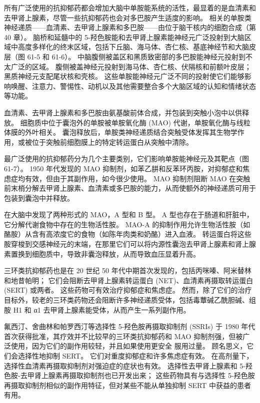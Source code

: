 所有广泛使用的抗抑郁药都会增加大脑中单胺能系统的活性，最显着的是血清素和去甲肾上腺素，尽管一些抗抑郁药也会对多巴胺产生适度的影响。 相关的单胺类神经递质——血清素、去甲肾上腺素和多巴胺——由位于脑干核内的细胞合成（第 40 章）。 脑桥和延髓中的 5-羟色胺能和去甲肾上腺素能神经元广泛投射到大脑区域中高度多样化的终末区域，包括下丘脑、海马体、杏仁核、基底神经节和大脑皮层（图 61-5 和 61-6）。 中脑腹侧被盖区和黑质致密部的多巴胺能神经元投射到不太广泛的区域。 腹侧被盖神经元投射到海马体、杏仁核、伏隔核和前额叶皮层； 黑质神经元支配尾状核和壳核。 这些单胺能神经元广泛不同的投射使它们能够影响唤醒、注意力、警惕性、动机以及其他需要整合多个大脑区域的认知和情绪状态等功能。

血清素、去甲肾上腺素和多巴胺由氨基酸前体合成，并包装到突触小泡中以供释放。 细胞质中位于囊泡外的单胺被单胺氧化酶 (MAO) 代谢，单胺氧化酶与线粒体膜的外叶相关。 囊泡释放后，单胺类神经递质结合突触受体发挥其生物学作用，或被位于突触前细胞膜上的特定转运蛋白从突触中清除。

最广泛使用的抗抑郁药分为几个主要类别，它们影响单胺能神经元及其靶点（图 61-7）。 1950 年代发现的 MAO 抑制剂，如苯乙肼和反苯环丙胺，对抑郁症和焦虑症均有效，但由于其副作用，如今很少使用。 MAO 抑制剂阻断 MAO 在突触前末梢分解去甲肾上腺素、血清素或多巴胺的能力，从而使额外的神经递质可用于包装到囊泡中并释放。

在大脑中发现了两种形式的 MAO，A 型和 B 型。 A 型也存在于肠道和肝脏中，它分解代谢食物中存在的生物活性胺。 MAO-A 的抑制作用允许生物活性胺（如酪胺）从含有高浓度它的食物（如陈年肉类和奶酪）进入血液。 转运蛋白将这些胺穿梭到交感神经元的末端，在那里它们可以将内源性囊泡去甲肾上腺素和肾上腺素置换到细胞质中，导致非囊泡释放，从而导致血压显着升高。

三环类抗抑郁药也是在 20 世纪 50 年代中期首次发现的，包括丙咪嗪、阿米替林和地昔帕明； 它们会阻断去甲肾上腺素转运蛋白 (NET)、血清素再摄取转运蛋白 (SERT) 或两者。 这些药物可有效治疗抑郁症和焦虑症。 然而，除了它们的治疗目标外，较老的三环类药物还会阻断许多神经递质受体，包括毒蕈碱乙酰胆碱、组胺 H1 和 α1 去甲肾上腺素能受体，从而产生一系列副作用。

氟西汀、舍曲林和帕罗西汀等选择性 5-羟色胺再摄取抑制剂 (SSRIs) 于 1980 年代首次获得批准，其疗效并不比较早的三环类抗抑郁药和 MAO 抑制剂强，但被广泛使用，因为它们的副作用较轻，并且如果使用更安全 服用过量。 顾名思义，它们会选择性地抑制 SERT。 它们对重度抑郁症和许多焦虑症有效。 在高剂量下，选择性血清素再摄取抑制剂对强迫症的症状也有效。 选择性去甲肾上腺素和 5-羟色胺-去甲肾上腺素再摄取抑制剂也已开发出来； 这些药物具有与选择性 5-羟色胺再摄取抑制剂相似的副作用特征，但对某些不能从单独抑制 SERT 中获益的患者有用。

